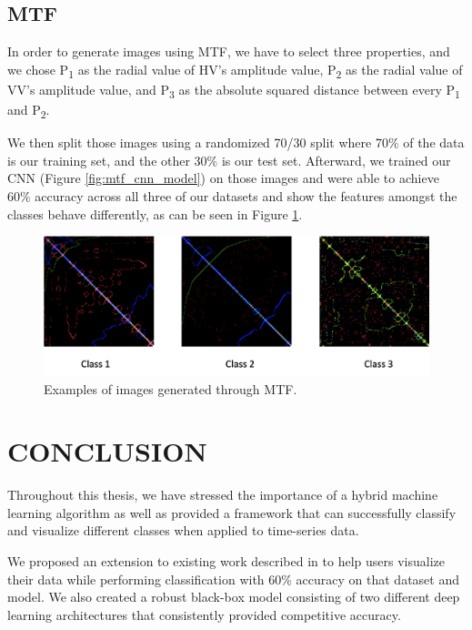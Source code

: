 \documentclass{turabian-thesis}[12pt]
\begin{document}
\section{ MTF }
 
In order to generate images using MTF, we have to select three properties, and we chose P\textsubscript{1} as the radial value of HV's amplitude value, P\textsubscript{2} as the radial value of VV's amplitude value, and P\textsubscript{3} as the absolute squared distance between every P\textsubscript{1} and P\textsubscript{2}. 

We then split those images using a randomized 70/30 split where 70\% of the data is our training set, and the other 30\% is our test set. Afterward, we trained our CNN (Figure \ref{fig:mtf_cnn_model}) on those images and were able to achieve 60\% accuracy across all three of our datasets and show the features amongst the classes behave differently, as can be seen in Figure \ref{fig:whitebox_images}.

\begin{figure}[h!]
   \begin{center}
      \includegraphics[scale=0.5]{../media/whitebox_images.png}
   \end{center}
   \caption{Examples of images generated through MTF.}
   \label{fig:whitebox_images}
\end{figure}


\chapter{CONCLUSION}
\label{chap:conclusion}
Throughout this thesis, we have stressed the importance of a hybrid machine learning algorithm as well as provided a framework that can successfully classify and visualize different classes when applied to time-series data. 

We proposed an extension to existing work described in \cite{wang_encoding_nodate} to help users visualize their data while performing classification  with 60\% accuracy on that dataset and model. We also created a robust black-box model consisting of two different deep learning architectures that consistently provided competitive accuracy.
\end{document}
